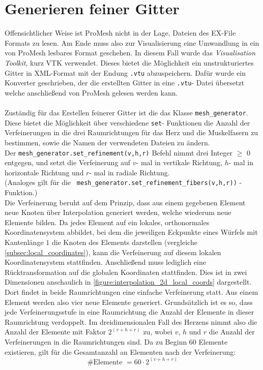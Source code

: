 \documentclass[
	a4paper,			%
	11pt,				%
	headsepline,		%
	bibtotoc,			%
	BCOR18mm,      		%
	DIV14,				%
	headings=normal,
	numbers=noenddot,
]{scrbook}
\theoremstyle{mythmstyle}
\theoremstyle{other}
\begin{document}
	\section{Generieren feiner Gitter}
	Offensichtlicher Weise ist ProMesh nicht in der Lage, Dateien des EX-File Formats zu lesen. Am Ende
	 muss also zur Visualisierung eine Umwandlung in ein von ProMesh lesbares Format geschehen. In diesem Fall
	 wurde das \emph{Visualisation Toolkit}, kurz VTK verwendet. Dieses bietet die Möglichkeit ein 
	 unstrukturiertes Gitter in XML-Format mit der Endung \verb!.vtu! abzuspeichern. Dafür wurde ein 
	 Konverter geschrieben, der die erstellten Gitter in eine \verb!.vtu!- Datei übersetzt welche anschließend
	 von ProMesh gelesen werden kann.\\\\
	 Zuständig für das Erstellen feinerer Gitter ist die das Klasse \verb!mesh_generator!. Diese bietet die 
	 Möglichkeit über verschiedene \verb!set!- Funktionen die Anzahl der Verfeinerungen in die drei Raumrichtungen
	 für das Herz und die Muskelfasern zu bestimmen, sowie die Namen der verwendeten Dateien zu ändern.
	  \\Der \verb!mesh_generator.set_refinement(v,h,r)! Befehl
	 nimmt drei Integer $\geq$ 0 entgegen, und setzt die Verfeinerung auf $v$- mal in vertikale Richtung,
	  $h$- mal in
	 horizontale Richtung und $r$- mal in radiale Richtung. \\(Analoges gilt für die 
	 \verb! mesh_generator.set_refinement_fibers(v,h,r))! -Funktion.)\\
	 Die Verfeinerung beruht auf dem Prinzip, dass aus einem gegebenen Element neue Knoten über Interpolation
	 generiert werden, welche wiederum neue Elemente bilden. Da jedes Element auf ein lokales, orthonormales
	 Koordinatensystem abbildet, bei dem die jeweiligen Eckpunkte eines Würfels mit Kantenlänge $1$ die Knoten
	 des Elements darstellen (vergleiche \autoref{subsec:local_coordinates}), kann die Verfeinerung auf
	 diesem lokalen Koordinatensystem stattfinden. Anschließend muss lediglich eine Rücktransformation auf die
	 globalen Koordinaten stattfinden. Dies ist in zwei Dimensionen anschaulich in
	 \autoref{figure:interpolation_2d_local_coords} dargestellt. Dort findet in beide Raumrichtungen eine
	 einfache Verfeinerung statt.  Aus einem Element werden also vier neue Elemente generiert. Grundsätzlich ist
	 es so, dass jede Verfeinerungsstufe in eine Raumrichtung die Anzahl der Elemente in dieser Raumrichtung 
	 verdoppelt. Im dreidimensionalen Fall des Herzens nimmt also die Anzahl der Elemente mit Faktor
	 $2^{(v + h + r)}$ zu, wobei $v$, $h$ und $r$ die Anzahl der Verfeinerungen in die Raumrichtungen sind.
	 Da zu Beginn 60 Elemente existieren, gilt für die Gesamtanzahl an Elementen nach der Verfeinerung:\[
	 	\#\text{Elemente }= 60\cdot 2^{(v + h + r)}\]
	 \clearpage
	 
\end{document}
